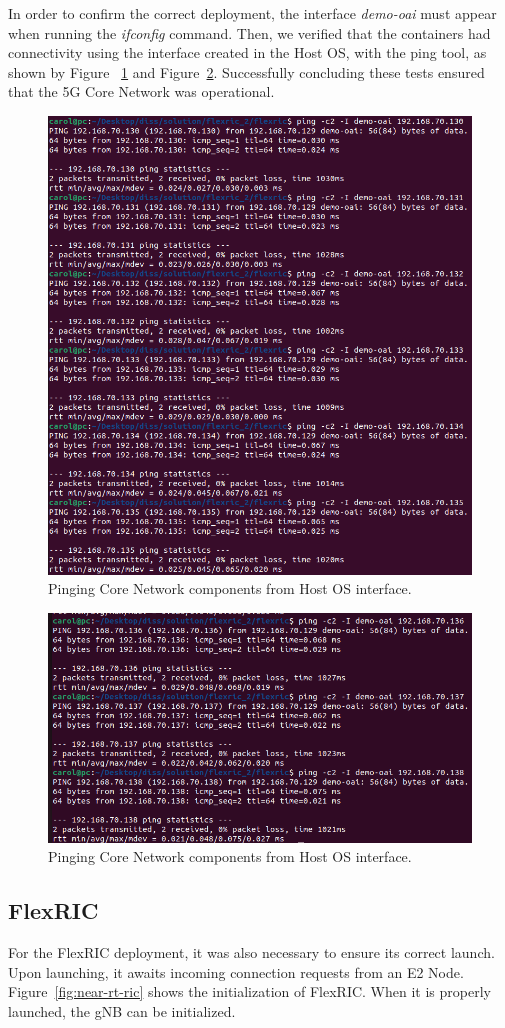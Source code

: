 In order to confirm the correct deployment, the interface \textit{demo-oai} must appear when running the \textit{ifconfig} command.
Then, we verified that the containers had connectivity using the interface created in the Host OS, with the ping tool, as shown by Figure ~\ref{fig:ping_core1} and Figure~\ref{fig:ping_core2}.
Successfully concluding these tests ensured that the 5G Core Network was operational.

\begin{figure}[H]
\centering
\includegraphics[width=0.5\linewidth]{figures/ping_core_1}
\caption[Pinging Core Network components from Host OS
interface]{Pinging Core Network components from Host OS
interface.}
\label{fig:ping_core1}
\end{figure}

\begin{figure}[H]
    \centering
    \includegraphics[width=0.5\linewidth]{figures/ping_core_2}
    \caption[Pinging Core Network components from Host OS
    interface]{Pinging Core Network components from Host OS
    interface.}
    \label{fig:ping_core2}
\end{figure}




\subsection{FlexRIC}\label{subsec:flexric2}
For the FlexRIC deployment, it was also necessary to ensure its correct launch.
Upon launching, it awaits incoming connection requests from an E2 Node.
Figure~\ref{fig:near-rt-ric} shows the initialization of FlexRIC\@.
When it is properly launched, the gNB can be initialized.

